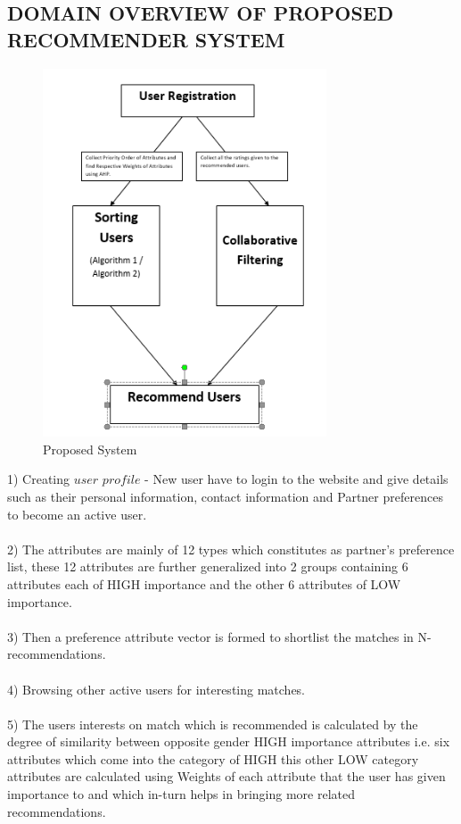 \documentclass[12pt,oneside]{book}
\begin{document}
\subsection{DOMAIN OVERVIEW OF PROPOSED RECOMMENDER SYSTEM}
\begin{figure}[h]
    \centering
    \includegraphics[width=0.75\textwidth]{flow}
    \caption{Proposed System}
    \label{fig:flow}
\end{figure}
1) Creating $user$ $profile$ - New user have to login to the website and give details such as their personal information, contact information and Partner preferences to become an active user.\\\\
2) The attributes are mainly of 12 types which constitutes as  partner's preference list, these 12 attributes are further generalized into 2 groups containing 6 attributes each of HIGH importance and the other 6 attributes of LOW importance.\\\\
3) Then a preference attribute vector is formed to shortlist the matches in N-recommendations.\\\\
4) Browsing other active users for interesting matches.\\\\
5) The users interests on match which is recommended is calculated by the degree of similarity between opposite gender HIGH importance attributes i.e. six attributes which come into the category of HIGH this other LOW category attributes are calculated using Weights of each attribute that the user has given importance to and which in-turn helps in bringing more related recommendations.\\\\
\end{document}
